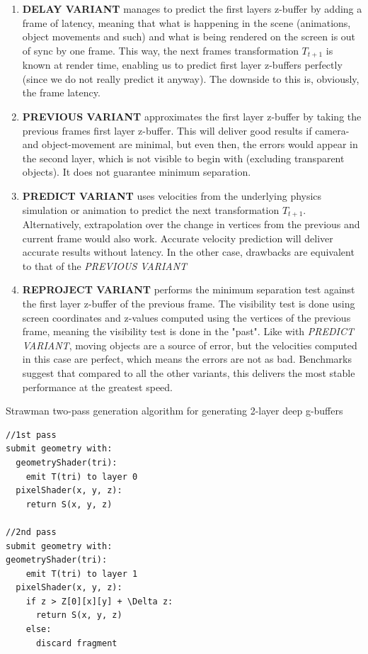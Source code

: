 \documentclass{ACGSeminar}
\begin{document}
		\begin{enumerate}
			\item \textbf{DELAY VARIANT} manages to predict the first layers z-buffer by adding a frame of latency, meaning that what is happening in the scene (animations, object movements and such) and what is being rendered on the screen is out of sync by one frame. This way, the next frames transformation $T_{t+1}$ is known at render time, enabling us to predict first layer z-buffers perfectly (since we do not really predict it anyway). The downside to this is, obviously, the frame latency.

			\item \textbf{PREVIOUS VARIANT} approximates the first layer z-buffer by taking the previous frames first layer z-buffer. This will deliver good results if camera- and object-movement are minimal, but even then, the errors would appear in the second layer, which is not visible to begin with (excluding transparent objects). It does not guarantee minimum separation.

			\item \textbf{PREDICT VARIANT} uses velocities from the underlying physics simulation or animation to predict the next transformation $T_{t+1}$. Alternatively, extrapolation over the change in vertices from the previous and current frame would also work. Accurate velocity prediction will deliver accurate results without latency. In the other case, drawbacks are equivalent to that of the \textit{PREVIOUS VARIANT}

			\item \textbf{REPROJECT VARIANT} performs the minimum separation test against the first layer z-buffer of the previous frame. The visibility test is done using screen coordinates and z-values computed using the vertices of the previous frame, meaning the visibility test is done in the "past". Like with \textit{PREDICT VARIANT}, moving objects are a source of error, but the velocities computed in this case are perfect, which means the errors are not as bad. Benchmarks suggest that compared to all the other variants, this delivers the most stable performance at the greatest speed.

		\end{enumerate} 
		\begin{algorithm} \label{alg:two_pass_strawman} \caption{Strawman two-pass generation algorithm for generating 2-layer deep g-buffers}
		\begin{lstlisting}[frame=single]
//1st pass
submit geometry with:
  geometryShader(tri):
    emit T(tri) to layer 0
  pixelShader(x, y, z):
    return S(x, y, z)

//2nd pass
submit geometry with:
geometryShader(tri):
    emit T(tri) to layer 1
  pixelShader(x, y, z):
    if z > Z[0][x][y] + \Delta z:
      return S(x, y, z)
    else:
      discard fragment
		\end{lstlisting}
		\end{algorithm}
		 
\end{document}
